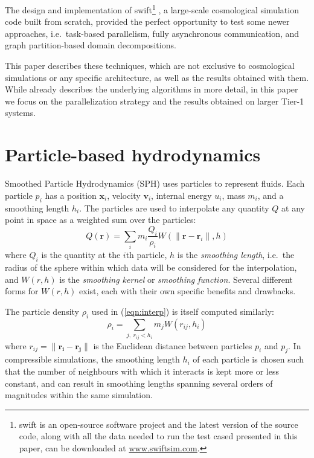 \documentclass{sig-alternate-05-2015}
\newcommand{\eqn}[1] {(\ref{eqn:#1})}
\newcommand{\swift}{{\sc swift}\xspace}
\newcommand{\web}{\url{www.swiftsim.com}}
\begin{document}
The design and implementation of \swift\footnote{
\swift is an open-source software project and the latest version of
the source code, along with all the data needed to run the test cased
presented in this paper, can be downloaded at \web.}
\cite{gonnet2013swift,theuns2015swift,ref:Gonnet2015}, a large-scale
cosmological simulation code built from scratch, provided the perfect
opportunity to test some newer
approaches, i.e.~task-based parallelism, fully asynchronous communication, and
graph partition-based domain decompositions.

This paper describes these techniques, which are not exclusive to
cosmological simulations or any specific architecture, as well as
the results obtained with them.
While \cite{gonnet2013swift,ref:Gonnet2015} already describes the underlying algorithms
in more detail, in this paper we focus on the parallelization strategy
and the results obtained  on larger Tier-1 systems.



\section{Particle-based hydrodynamics}

Smoothed Particle Hydrodynamics \cite{Gingold1977,Price2012} (SPH) uses
particles to represent fluids.  Each particle $p_i$ has a position $\mathbf
x_i$, velocity $\mathbf v_i$, internal energy $u_i$, mass $m_i$, and a smoothing
length $h_i$.  The particles are used to interpolate any quantity $Q$ at any
point in space as a weighted sum over the particles:
%
\begin{equation}
    Q(\mathbf r) = \sum_i m_i \frac{Q_i}{\rho_i} W( \|\mathbf r - \mathbf r_i\| , h )
    \label{eqn:interp}
\end{equation}
%
where $Q_i$ is the quantity at the $i$th particle, $h$ is the {\em smoothing
  length}, i.e.~the radius of the sphere within which data will be considered
for the interpolation, and $W(r,h)$ is the {\em smoothing kernel} or {\em
  smoothing function}.  Several different forms for $W(r,h)$ exist, each with
their own specific benefits and drawbacks.

The particle density $\rho_i$ used in \eqn{interp} is itself computed similarly:
%
\begin{equation}
    \rho_i = \sum_{j,~r_{ij} < h_i} m_j W(r_{ij},h_i)
    \label{eqn:rho}
\end{equation}
%
where $r_{ij} = \|\mathbf{r_i}-\mathbf{r_j}\|$ is the Euclidean distance between
particles $p_i$ and $p_j$.  In compressible simulations, the smoothing length
$h_i$ of each particle is chosen such that the number of neighbours with which
it interacts is kept more or less constant, and can result in smoothing lengths
spanning several orders of magnitudes within the same simulation.
\end{document}

